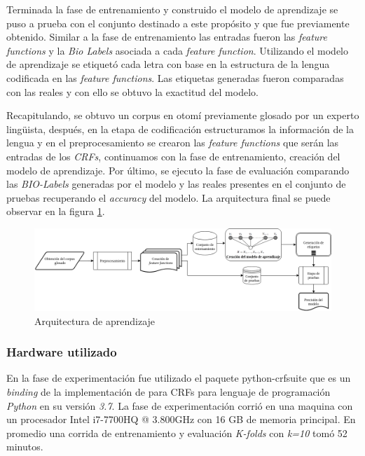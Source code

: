 \documentclass[letterpaper,12pt,oneside]{book}
\theoremstyle{definition}
\begin{document}
Terminada la fase de entrenamiento y construido el modelo de aprendizaje se puso a prueba con el conjunto destinado a este propósito y que fue previamente obtenido. Similar a la fase de entrenamiento las entradas fueron las \textit{feature functions} y la \textit{Bio Labels} asociada a cada \textit{feature function}. Utilizando el modelo de aprendizaje se etiquetó cada letra con base en la estructura de la lengua codificada en las \textit{feature functions}. Las etiquetas generadas fueron comparadas con las reales y con ello se obtuvo la exactitud del modelo. 

Recapitulando, se obtuvo un corpus en otomí previamente glosado por un experto lingüista, después, en la etapa de codificación estructuramos la información de la lengua y en el preprocesamiento se crearon las \textit{feature functions} que serán las entradas de los \textit{CRFs}, continuamos con la fase de entrenamiento, creación del modelo de aprendizaje. Por último, se ejecuto la fase de evaluación comparando las \textit{BIO-Labels} generadas por el modelo y las reales presentes en el conjunto de pruebas recuperando el \textit{accuracy} del modelo. La arquitectura final se puede observar en la figura \ref{fig:architecture}.

\begin{figure}[ht]
	\centering
	\includegraphics[width=\textwidth]{img/arquitectura}
	\caption{Arquitectura de aprendizaje}
	\label{fig:architecture}
\end{figure}

\subsubsection{Hardware utilizado}

En la fase de experimentación fue utilizado el paquete \textsf{python-crfsuite} que es un \textit{binding} de la implementación de \citet{CRFsuite} para CRFs para lenguaje de programación \textit{Python} en su versión \textit{3.7}. La fase de experimentación corrió en una maquina con un procesador \textsf{Intel i7-7700HQ @ 3.800GHz} con \textsf{16 GB} de memoria principal. En promedio una corrida de entrenamiento y evaluación \textit{K-folds} con \textit{k=10} tomó 52 minutos.
\end{document}
